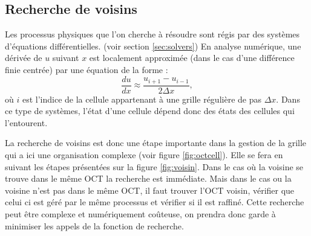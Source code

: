 

\subsection{Recherche de voisins}
\label{sec:voisins}

Les processus physiques que l'on cherche à résoudre sont régis par des systèmes d'équations différentielles. (voir section \ref{sec:solvers})
En analyse numérique, une dérivée de $u$ suivant $x$ est localement approximée (dans le cas d'une différence finie centrée) par une équation de la forme :
\begin{equation}
\frac{d u}{dx} \approx \frac{u_{i+1}  - u_{i-1}}{2\Delta x}, 
\end{equation}
où $i$ est l'indice de la cellule appartenant à une grille régulière de pas $\Delta x$.
Dans ce type de systèmes, l'état d'une cellule dépend donc des états des cellules qui l'entourent.

La recherche de voisins est donc une étape importante dans la gestion de la grille qui a ici une organisation complexe (voir figure \ref{fig:octcell}).
Elle se fera en suivant les étapes présentées sur la figure \ref{fig:voisin}.
Dans le cas où la voisine se trouve dans le même OCT la recherche est immédiate.
Mais dans le cas ou la voisine n'est pas dans le même OCT, il faut trouver l'OCT voisin, vérifier que celui ci est géré par le même processus et vérifier si il est raffiné.
Cette recherche peut être complexe et numériquement coûteuse, on prendra donc garde à minimiser les appels de la fonction de recherche. 

